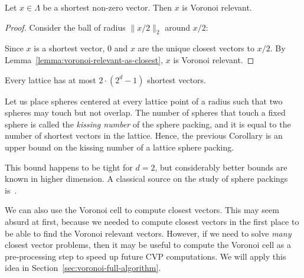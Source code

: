\begin{lemma}
  Let $x \in \Lambda$ be a shortest non-zero vector.
  Then $x$ is Voronoi relevant.
\end{lemma}
\begin{proof}
  Consider the ball of radius $\|x/2\|_2$ around $x/2$:
  \begin{center}
  \end{center}
  Since $x$ is a shortest vector, $0$ and $x$ are the unique closest vectors to $x/2$.
  By Lemma~\ref{lemma:voronoi-relevant-as-closest}, $x$ is Voronoi relevant.
\end{proof}

\begin{corollary}
  Every lattice has at most $2 \cdot (2^d - 1)$ shortest vectors.
\end{corollary}

\begin{remark}
  Let us place spheres centered at every lattice point of a radius
  such that two spheres may touch but not overlap.
  The number of spheres that touch a fixed sphere is called the \emph{kissing number}
  of the sphere packing,
  and it is equal to the number of shortest vectors in the lattice.
  Hence, the previous Corollary is an upper bound on the kissing number
  of a lattice sphere packing.

  This bound happens to be tight for $d = 2$,
  but considerably better bounds are known in higher dimension.
  A classical source on the study of sphere packings is~\cite{MR1662447}.
\end{remark}

We can also use the Voronoi cell to compute closest vectors.
This may seem absurd at first,
because we needed to compute closest vectors in the first place to be able to
find the Voronoi relevant vectors.
However, if we need to solve \emph{many} closest vector problems,
then it may be useful to compute the Voronoi cell as a pre-processing step
to speed up future CVP computations.
We will apply this idea in Section~\ref{sec:voronoi-full-algorithm}.

